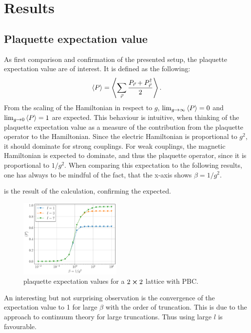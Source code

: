 \section{Results}
\subsection{Plaquette expectation value}
As first comparison and confirmation of the presented setup, the plaquette expectation value are of interest. It is defined as the following:
\begin{align}
	\Braket{P} = \Braket{\sum_{\vec{r}}\frac{P_{\vec{r}}+P_{\vec{r}}^{\dag}}{2}}.
\end{align}
From the scaling of the Hamiltonian in respect to $g$, $\lim_{g\rightarrow\infty}\Braket{P}=0$ and $\lim_{g\rightarrow0}\Braket{P}=1$ are expected.
This behaviour is intuitive, when thinking of the plaquette expectation value as a measure of the contribution from the plaquette operator to the Hamiltonian. Since the electric Hamiltonian is proportional to $g^2$, it should dominate for strong couplings. For weak couplings, the magnetic Hamiltonian is expected to dominate, and thus the plaquette operator, since it is proportional to $1/g^2$. When comparing this expectation to the following results, one has always to be mindful of the fact, that the x-axis shows $\beta=1/g^2$.

 is the result of the calculation, confirming the expected.
\begin{figure}[h]
	\begin{center}
		\includegraphics[width=0.45\textwidth]{images/PlaquetteExp2x2PBC.pdf}
	\end{center}
	\caption{plaquette expectation values for a $2\cross2$ lattice with PBC.}\label{fig:2exp}
\end{figure}
An interesting but not surprising observation is the convergence of the expectation value to 1 for large $\beta$ with the order of truncation. This is due to the approach to continuum theory for large truncations. Thus using large $l$ is favourable.

